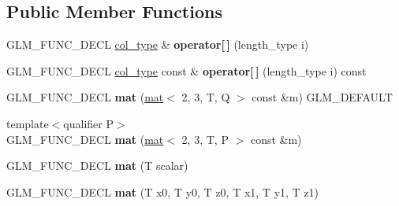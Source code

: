 \subsection*{Public Member Functions}
\begin{DoxyCompactItemize}
\item 
\mbox{\label{structglm_1_1mat_3_012_00_013_00_01T_00_01Q_01_4_a946520cc2889c97e6841cbf5c36ee715}} 
G\+L\+M\+\_\+\+F\+U\+N\+C\+\_\+\+D\+E\+CL \hyperlink{structglm_1_1vec_3_013_00_01T_00_01Q_01_4}{col\+\_\+type} \& {\bfseries operator\mbox{[}$\,$\mbox{]}} (length\+\_\+type i)
\item 
\mbox{\label{structglm_1_1mat_3_012_00_013_00_01T_00_01Q_01_4_abef4a7f73eb38bb050aad6894e1189d8}} 
G\+L\+M\+\_\+\+F\+U\+N\+C\+\_\+\+D\+E\+CL \hyperlink{structglm_1_1vec_3_013_00_01T_00_01Q_01_4}{col\+\_\+type} const  \& {\bfseries operator\mbox{[}$\,$\mbox{]}} (length\+\_\+type i) const
\item 
\mbox{\label{structglm_1_1mat_3_012_00_013_00_01T_00_01Q_01_4_a77e8e84ad2adc4878fc35384a382dd78}} 
G\+L\+M\+\_\+\+F\+U\+N\+C\+\_\+\+D\+E\+CL {\bfseries mat} (\hyperlink{structglm_1_1mat}{mat}$<$ 2, 3, T, Q $>$ const \&m) G\+L\+M\+\_\+\+D\+E\+F\+A\+U\+LT
\item 
\mbox{\label{structglm_1_1mat_3_012_00_013_00_01T_00_01Q_01_4_a596bf330796f734807d3f8fe85a7ab72}} 
{\footnotesize template$<$qualifier P$>$ }\\G\+L\+M\+\_\+\+F\+U\+N\+C\+\_\+\+D\+E\+CL {\bfseries mat} (\hyperlink{structglm_1_1mat}{mat}$<$ 2, 3, T, P $>$ const \&m)
\item 
\mbox{\label{structglm_1_1mat_3_012_00_013_00_01T_00_01Q_01_4_a1bf53e7edfb9d280a2804ca5858cc528}} 
G\+L\+M\+\_\+\+F\+U\+N\+C\+\_\+\+D\+E\+CL {\bfseries mat} (T scalar)
\item 
\mbox{\label{structglm_1_1mat_3_012_00_013_00_01T_00_01Q_01_4_a13098ef6d1d42561d3a705a3c68e03b2}} 
G\+L\+M\+\_\+\+F\+U\+N\+C\+\_\+\+D\+E\+CL {\bfseries mat} (T x0, T y0, T z0, T x1, T y1, T z1)

\end{DoxyCompactItemize}
